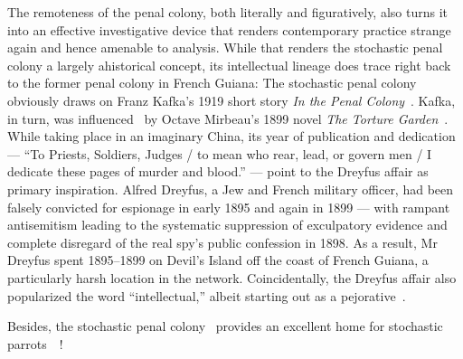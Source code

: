 The remoteness of the penal colony, both literally and figuratively, also turns
it into an effective investigative device that renders contemporary practice
strange again and hence amenable to analysis. While that renders the stochastic
penal colony a largely ahistorical concept, its intellectual lineage does trace
right back to the former penal colony in French Guiana: The stochastic penal
colony obviously draws on Franz Kafka's 1919 short story \emph{In the Penal
Colony}~\cite{Kafka1995}. Kafka, in turn, was influenced~\cite{Robertson2017} by
Octave Mirbeau's 1899 novel \emph{The Torture Garden}~\cite{Mirbeau2008}. While
taking place in an imaginary China, its year of publication and dedication ---
``To Priests, Soldiers, Judges / to mean who rear, lead, or govern men / I
dedicate these pages of murder and blood.'' --- point to the Dreyfus affair as
primary inspiration. Alfred Dreyfus, a Jew and French military officer, had been
falsely convicted for espionage in early 1895 and again in 1899 --- with rampant
antisemitism leading to the systematic suppression of exculpatory evidence and
complete disregard of the real spy's public confession in 1898. As a result, Mr
Dreyfus spent 1895--1899 on Devil's Island off the coast of French Guiana, a
particularly harsh location in the network. Coincidentally, the Dreyfus affair
also popularized the word ``intellectual,'' albeit starting out as a
pejorative~\cite{Drake2005,StudentsAtTheUniversityOfBristol2021}.

Besides, the stochastic penal colony~ provides an excellent
home for stochastic parrots~~\cite{BenderGebruea2021}!

